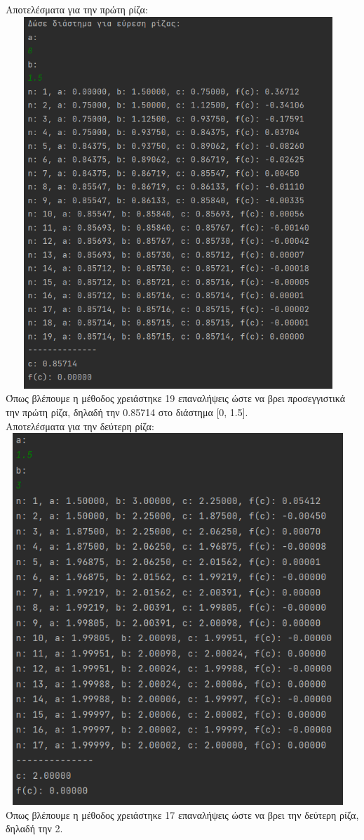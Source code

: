 \documentclass{article}
\begin{document}
Αποτελέσματα για την πρώτη ρίζα: \\
\includegraphics[width=13cm, height=14cm]{images/results_1.png} \\ 
Όπως βλέπουμε η μέθοδος χρειάστηκε 19 επαναλήψεις ώστε να βρει προσεγγιστικά την πρώτη ρίζα, δηλαδή την 0.85714 στο διάστημα [0, 1.5]. \\ 

Αποτελέσματα για την δεύτερη ρίζα: \\
\includegraphics[width=13cm, height=14cm]{images/results_2.png} \\
Όπως βλέπουμε η μέθοδος χρειάστηκε 17 επαναλήψεις ώστε να βρει την δεύτερη ρίζα, δηλαδή την 2. \\ 
\end{document}
